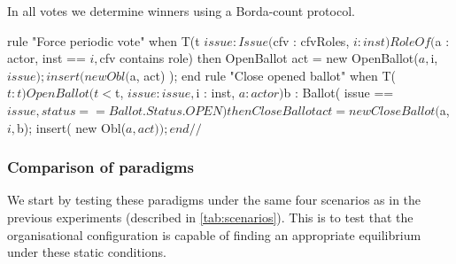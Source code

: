 In all votes we determine winners using a Borda-count protocol. 

\begin{drools}[label=lst:periodicballot,caption=Rules to force opening and closing of ballots]
rule "Force periodic vote"
	when
		T(t %
		$issue : Issue($cfv : cfvRoles, $i : inst)
		RoleOf($a : actor, inst == $i, $cfv contains role)
	then
		OpenBallot act = new OpenBallot($a, $i, $issue);
		insert( new Obl($a, act) );
end
rule "Close opened ballot"
	when
		T($t : t)
		OpenBallot(t < $t, $issue : issue, $i : inst, $a : actor)
		$b : Ballot( issue == $issue, status == Ballot.Status.OPEN )
	then
		CloseBallot act = new CloseBallot($a, $i, $b);
		insert( new Obl($a, act) );
end//$
\end{drools}



\subsubsection*{Comparison of paradigms}

We start by testing these paradigms under the same four scenarios as in the
previous experiments (described in \autoref{tab:scenarios}). This is to test
that the organisational configuration is capable of finding an appropriate
equilibrium under these static conditions.

